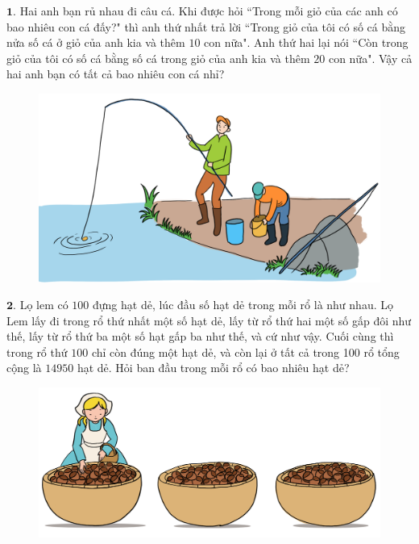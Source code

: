 \begin{multicols}{2}
	$\pmb{1.}$ Hai anh bạn rủ nhau đi câu cá. Khi được hỏi ``Trong mỗi giỏ của các anh có bao nhiêu con cá đấy?" thì anh thứ nhất trả lời ``Trong giỏ của tôi có số cá bằng nửa số cá ở giỏ của anh kia và thêm $10$ con nữa". Anh thứ hai lại nói ``Còn trong giỏ của tôi có số cá bằng số cá trong giỏ của anh kia và thêm $20$ con nữa". Vậy cả hai anh bạn có tất cả bao nhiêu con cá nhỉ? 
	\begin{figure}[H]
			\centering
			\vspace*{-10pt}
			\captionsetup{labelformat= empty, justification=centering}
			\includegraphics[width=1\linewidth]{Pi10_ToanBi_Bai1}
			\vspace*{-15pt}
		\end{figure}
	\vskip 0.1cm
	$\pmb{2.}$ Lọ lem có $100$  đựng hạt dẻ, lúc đầu số hạt dẻ trong mỗi rổ là như nhau. Lọ Lem lấy đi trong rổ thứ nhất một số hạt dẻ, lấy từ rổ  thứ hai một số gấp đôi như thế, lấy từ rổ thứ ba một số hạt gấp ba như thế, và cứ như vậy. Cuối cùng thì trong rổ thứ $100$ chỉ còn đúng một hạt dẻ, và còn lại ở tất cả trong 100 rổ tổng cộng là $14950$ hạt dẻ. Hỏi ban đầu trong mỗi rổ có bao nhiêu hạt dẻ?
	\begin{figure}[H]
			\centering
			\vspace*{-10pt}
			\captionsetup{labelformat= empty, justification=centering}
			\includegraphics[width=0.97\linewidth]{Pi10_ToanBi_Bai2}

\end{figure}
\end{multicols}
